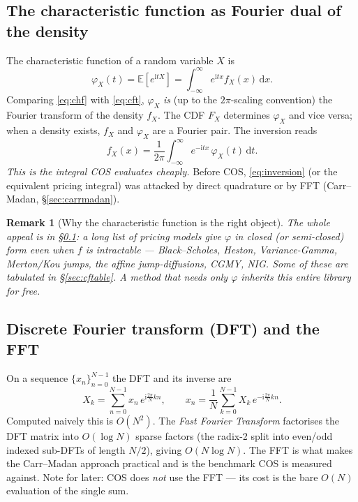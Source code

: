 \documentclass[11pt]{article}
\newcommand{\E}{\mathbb{E}}
\newcommand{\ii}{\mathrm{i}}
\newcommand{\dd}{\,\mathrm{d}}
\newcommand{\ch}{\varphi}
\newtheorem{remark}{Remark}
\begin{document}
\subsection{The characteristic function as Fourier dual of the density}\label{sec:cf}
The characteristic function of a random variable $X$ is
\begin{equation}\label{eq:chf}
\ch_X(t)=\E\!\left[e^{\ii t X}\right]=\int_{-\infty}^{\infty} e^{\ii t x} f_X(x)\dd x .
\end{equation}
Comparing \eqref{eq:chf} with \eqref{eq:cft}, $\ch_X$ \emph{is} (up to the $2\pi$-scaling convention) the
Fourier transform of the density $f_X$. The CDF $F_X$ determines $\ch_X$ and vice versa; when a density exists,
$f_X$ and $\ch_X$ are a Fourier pair. The inversion reads
\begin{equation}\label{eq:inversion}
f_X(x)=\frac{1}{2\pi}\int_{-\infty}^{\infty} e^{-\ii t x}\,\ch_X(t)\dd t .
\end{equation}
\emph{This is the integral COS evaluates cheaply.} Before COS, \eqref{eq:inversion} (or the equivalent pricing
integral) was attacked by direct quadrature or by FFT (Carr--Madan, \S\ref{sec:carrmadan}).

\begin{remark}[Why the characteristic function is the right object]
The whole appeal is in \S\ref{sec:cf}: a long list of pricing models give $\ch$ in closed (or semi-closed)
form even when $f$ is intractable --- Black--Scholes, Heston, Variance-Gamma, Merton/Kou jumps, the affine
jump-diffusions, CGMY, NIG. Some of these are tabulated in \S\ref{sec:cftable}. A method that needs only $\ch$
inherits this entire library for free.
\end{remark}

\subsection{Discrete Fourier transform (DFT) and the FFT}
On a sequence $\{x_n\}_{n=0}^{N-1}$ the DFT and its inverse are
\begin{equation}
X_k=\sum_{n=0}^{N-1} x_n\,e^{\ii\frac{2\pi}{N}kn},
\qquad
x_n=\frac{1}{N}\sum_{k=0}^{N-1} X_k\,e^{-\ii\frac{2\pi}{N}kn}.
\end{equation}
Computed naively this is $O(N^2)$. The \emph{Fast Fourier Transform} factorises the DFT matrix into
$O(\log N)$ sparse factors (the radix-2 split into even/odd indexed sub-DFTs of length $N/2$), giving
$O(N\log N)$. The FFT is what makes the Carr--Madan approach practical and is the benchmark COS is measured
against. Note for later: COS does \emph{not} use the FFT --- its cost is the bare $O(N)$ evaluation of the
single sum.
\end{document}
